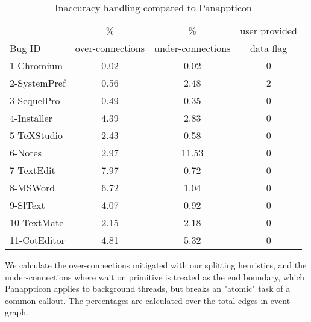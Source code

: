 
\begin{table}[ht]
\footnotesize
\centering
  \begin{tabularx}{\columnwidth}{l|ccc}
       & \% & \% & user provided \\
Bug ID & over-connections& under-connections & data flag \\
\hline
\hline
1-Chromium & 0.02 & 0.02 & 0 \\
2-SystemPref & 0.56 & 2.48 & 2 \\
3-SequelPro & 0.49 & 0.35 & 0 \\
4-Installer & 4.39 & 2.83 & 0 \\
5-TeXStudio & 2.43 & 0.58 & 0 \\
6-Notes & 2.97 & 11.53 & 0 \\
7-TextEdit & 7.97 & 0.72 & 0 \\
8-MSWord & 6.72 & 1.04 & 0 \\
9-SlText & 4.07 & 0.92 & 0 \\
10-TextMate & 2.15 & 2.18 & 0 \\
11-CotEditor & 4.81 & 5.32 & 0 \\
\hline
  \end{tabularx}

  \parbox{\columnwidth}
  {\caption{Inaccuracy handling compared to Panappticon} 
  	{
		We calculate the over-connections mitigated with our splitting heuristics, and
	the under-connections where wait on primitive is treated as the end boundary,
	which Panappticon applies to background threads, but breaks an "atomic" task
	of a common callout. The percentages are calculated over the total edges in event graph.
    }
  \label{table:statistics}
  }
\end{table}


